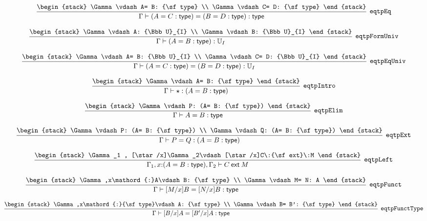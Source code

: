 \[
\infer[{\tt eqtpEq}]{\Gamma \vdash (A= C: {\sf type})= (B= D: {\sf type}): {\sf type}}{
\begin{stack}
\Gamma \vdash A= B: {\sf type}
\\
\Gamma \vdash C= D: {\sf type}
\end{stack}}
\]

\[
\infer[{\tt eqtpFormUniv}]{\Gamma \vdash (A= B: {\sf type}): {\Bbb U}_{I}}{
\begin{stack}
\Gamma \vdash A: {\Bbb U}_{I}
\\
\Gamma \vdash B: {\Bbb U}_{I}
\end{stack}}
\]

\[
\infer[{\tt eqtpEqUniv}]{\Gamma \vdash (A= C: {\sf type})= (B= D: {\sf type}): {\Bbb U}_{I}}{
\begin{stack}
\Gamma \vdash A= B: {\Bbb U}_{I}
\\
\Gamma \vdash C= D: {\Bbb U}_{I}
\end{stack}}
\]

\[
\infer[{\tt eqtpIntro}]{\Gamma \vdash \star : (A= B: {\sf type})}{
\begin{stack}
\Gamma \vdash A= B: {\sf type}
\end{stack}}
\]

\[
\infer[{\tt eqtpElim}]{\Gamma \vdash A= B: {\sf type}}{
\begin{stack}
\Gamma \vdash P: (A= B: {\sf type})
\end{stack}}
\]

\[
\infer[{\tt eqtpExt}]{\Gamma \vdash P= Q: (A= B: {\sf type})}{
\begin{stack}
\Gamma \vdash P: (A= B: {\sf type})
\\
\Gamma \vdash Q: (A= B: {\sf type})
\end{stack}}
\]

\[
\infer[{\tt eqtpLeft}]{\Gamma_1 ,x\mathord{:}(A= B: {\sf type}), \Gamma_2 \vdash C\:{\sf ext}\:M}{
\begin{stack}
\Gamma_1 , [\star /x]\Gamma_2\vdash [\star /x]C\:{\sf ext}\:M
\end{stack}}
\]

\[
\infer[{\tt eqtpFunct}]{\Gamma \vdash [M/x]B= [N/x]B: {\sf type}}{
\begin{stack}
\Gamma ,x\mathord{:}A\vdash B: {\sf type}
\\
\Gamma \vdash M= N: A
\end{stack}}
\]

\[
\infer[{\tt eqtpFunctType}]{\Gamma \vdash [B/x]A= [B'/x]A: {\sf type}}{
\begin{stack}
\Gamma ,x\mathord{:}{\sf type}\vdash A: {\sf type}
\\
\Gamma \vdash B= B': {\sf type}
\end{stack}}
\]

